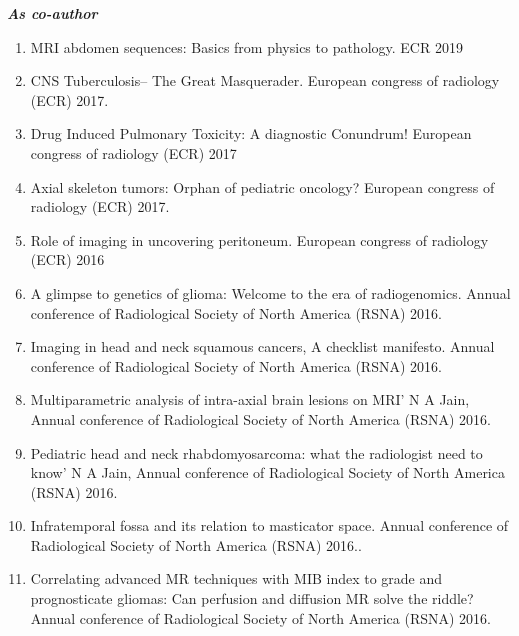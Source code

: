 \documentclass[a4paper,10pt]{article}
\begin{document}
\textbf{\textit{As co-author}}
\begin{enumerate}
  \vspace{-0.1cm}\item MRI abdomen sequences: Basics from physics to pathology. ECR 2019
  \vspace{-0.1cm}\item CNS Tuberculosis– The Great Masquerader. European congress of radiology (ECR) 2017.
  \vspace{-0.1cm}\item Drug Induced Pulmonary Toxicity: A diagnostic Conundrum! European congress of radiology (ECR) 2017
  \vspace{-0.1cm}\item Axial skeleton tumors: Orphan of pediatric oncology? European congress of radiology (ECR) 2017.
  \vspace{-0.1cm}\item Role of imaging in uncovering peritoneum. European congress of radiology (ECR) 2016
  \vspace{-0.1cm}\item A glimpse to genetics of glioma: Welcome to the era of radiogenomics. Annual conference of Radiological Society of North America (RSNA) 2016.
  \vspace{-0.1cm}\item Imaging in head and neck squamous cancers, A checklist manifesto. Annual conference of Radiological Society of North America (RSNA) 2016.
  \vspace{-0.1cm}\item Multiparametric analysis of intra-axial brain lesions on MRI' N A Jain, Annual conference of Radiological Society of North America (RSNA) 2016.
  \vspace{-0.1cm}\item Pediatric head and neck rhabdomyosarcoma: what the radiologist need to know' N A Jain, Annual conference of Radiological Society of North America (RSNA) 2016.
  \vspace{-0.1cm}\item Infratemporal fossa and its relation to masticator space. Annual conference of Radiological Society of North America (RSNA) 2016..
  \vspace{-0.1cm}\item Correlating advanced MR techniques with MIB index to grade and prognosticate gliomas: Can perfusion and diffusion MR solve the riddle? Annual conference of Radiological Society of North America (RSNA) 2016.
\end{enumerate}
\end{document}
